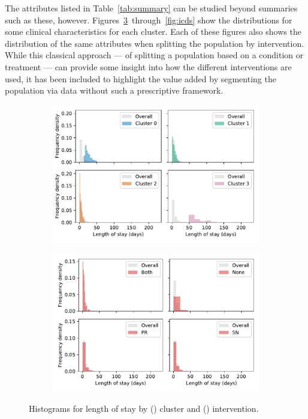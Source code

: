 The attributes listed in Table~\ref{tab:summary} can be studied beyond summaries
such as these, however. Figures~\ref{fig:los}~through~\ref{fig:icds} show the
distributions for some clinical characteristics for each cluster. Each of these
figures also shows the distribution of the same attributes when splitting the
population by intervention. While this classical approach --- of splitting a
population based on a condition or treatment --- can provide some insight into
how the different interventions are used, it has been included to highlight the
value added by segmenting the population via data without such a prescriptive
framework.

\begin{figure}
    \centering
    \begin{subfigure}{.5\imgwidth}
        \includegraphics[width=\linewidth]{cluster_true_los}
        \caption{}\label{fig:cluster_los}
    \end{subfigure}\hfill%
    \begin{subfigure}{.5\imgwidth}
        \includegraphics[width=\linewidth]{intervention_true_los}
        \caption{}\label{fig:intervention_los}
    \end{subfigure}
    \caption{%
        Histograms for length of stay by () cluster and
        () intervention.
    }\label{fig:los}
\end{figure}

